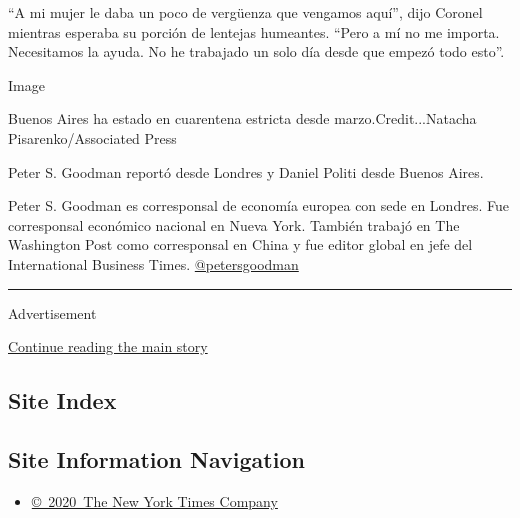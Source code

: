 ``A mi mujer le daba un poco de vergüenza que vengamos aquí'', dijo
Coronel mientras esperaba su porción de lentejas humeantes. ``Pero a mí
no me importa. Necesitamos la ayuda. No he trabajado un solo día desde
que empezó todo esto''.

Image

Buenos Aires ha estado en cuarentena estricta desde
marzo.Credit...Natacha Pisarenko/Associated Press

Peter S. Goodman reportó desde Londres y Daniel Politi desde Buenos
Aires.

Peter S. Goodman es corresponsal de economía europea con sede en
Londres. Fue corresponsal económico nacional en Nueva York. También
trabajó en The Washington Post como corresponsal en China y fue editor
global en jefe del International Business Times.
\href{https://twitter.com/petersgoodman}{@petersgoodman}

\begin{center}\rule{0.5\linewidth}{\linethickness}\end{center}

Advertisement

\protect\hyperlink{after-bottom}{Continue reading the main story}

\hypertarget{site-index}{%
\subsection{Site Index}\label{site-index}}

\hypertarget{site-information-navigation}{%
\subsection{Site Information
Navigation}\label{site-information-navigation}}

\begin{itemize}
\tightlist
\item
  \href{https://help.nytimes3xbfgragh.onion/hc/en-us/articles/115014792127-Copyright-notice}{©~2020~The
  New York Times Company}
\end{itemize}

